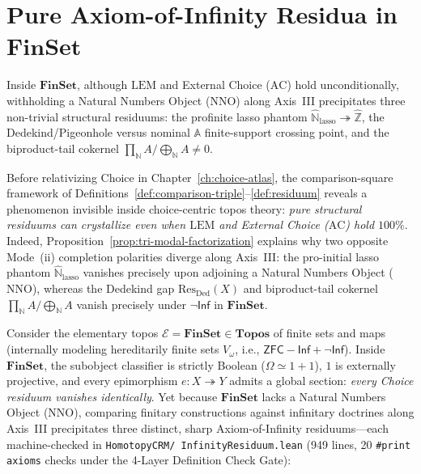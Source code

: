\section{Pure Axiom-of-Infinity Residua in $\mathbf{FinSet}$}\label{sec:finset-infinity}

\begin{theorem}\label{thm:finset-infinity-residua}%
%
%
Inside $\mathbf{FinSet}$, although $\mathrm{LEM}$ and External Choice ($\mathrm{AC}$) hold unconditionally, withholding a Natural Numbers Object ($\mathrm{NNO}$) along Axis~III precipitates three non-trivial structural residuums: the profinite lasso phantom $\widehat{\mathbb{N}}_{\mathrm{lasso}} \twoheadrightarrow \widehat{\mathbb{Z}}$, the Dedekind/Pigeonhole versus nominal $\mathbb{A}$ finite-support crossing point, and the biproduct-tail cokernel $\prod_{\mathbb{N}} A / \bigoplus_{\mathbb{N}} A \neq 0$.
\end{theorem}

Before relativizing Choice in Chapter~\ref{ch:choice-atlas}, the comparison-square framework of Definitions~\ref{def:comparison-triple}--\ref{def:residuum} reveals a phenomenon invisible inside choice-centric topos theory: \emph{pure structural residuums can crystallize even when $\mathrm{LEM}$ and External Choice ($\mathrm{AC}$) hold $100\%$}. Indeed, Proposition~\ref{prop:tri-modal-factorization} explains why two opposite Mode~(ii) completion polarities diverge along Axis~III: the pro-initial lasso phantom $\widehat{\mathbb{N}}_{\mathrm{lasso}}$ vanishes precisely upon adjoining a Natural Numbers Object ($\mathrm{NNO}$), whereas the Dedekind gap $\mathrm{Res}_{\mathrm{Ded}}(X)$ and biproduct-tail cokernel $\prod_{\mathbb{N}} A / \bigoplus_{\mathbb{N}} A$ vanish precisely under $\neg\mathsf{Inf}$ in $\mathbf{FinSet}$.

Consider the elementary topos $\mathcal{E} = \mathbf{FinSet} \in \mathbf{Topos}$ of finite sets and maps (internally modeling hereditarily finite sets $V_\omega$, i.e., $\mathsf{ZFC} - \mathsf{Inf} + \neg\mathsf{Inf}$). Inside $\mathbf{FinSet}$, the subobject classifier is strictly Boolean ($\Omega \simeq 1+1$), $1$ is externally projective, and every epimorphism $e : X \twoheadrightarrow Y$ admits a global section: \emph{every Choice residuum vanishes identically}. Yet because $\mathbf{FinSet}$ lacks a Natural Numbers Object ($\mathrm{NNO}$), comparing finitary constructions against infinitary doctrines along Axis~III precipitates three distinct, sharp Axiom-of-Infinity residuums---each machine-checked in \texttt{HomotopyCRM/ InfinityResiduum.lean} (949 lines, 20 \texttt{\#print axioms} checks under the 4-Layer Definition Check Gate):

